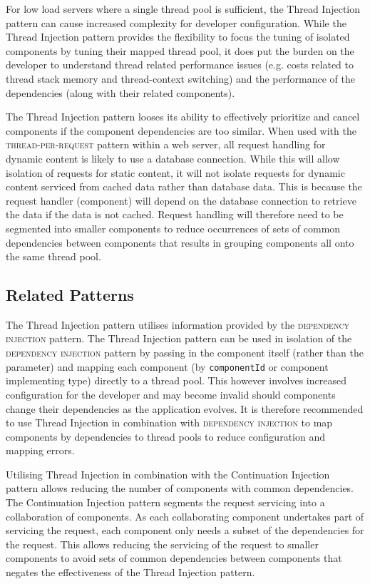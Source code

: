 \documentclass[prodmode]{style/acmlarge}
\begin{document}
For low load servers where a single thread pool is sufficient, the Thread
Injection pattern can cause increased complexity for developer configuration.
While the Thread Injection pattern provides the flexibility to focus the tuning
of isolated components by tuning their mapped thread pool, it does put the
burden on the developer to understand thread related performance issues (e.g.
costs related to thread stack memory and thread-context switching) and the
performance of the dependencies (along with their related components).

The Thread Injection pattern looses its ability to effectively prioritize and
cancel components if the component dependencies are too similar.  When used with
the \textsc{thread-per-request} pattern within a web server, all request
handling for dynamic content is likely to use a database connection.  While this
will allow isolation of requests for static content, it will not isolate
requests for dynamic content serviced from cached data rather than database
data.  This is because the request handler (component) will depend on the
database connection to retrieve the data if the data is not cached.  Request
handling will therefore need to be segmented into smaller components to reduce
occurrences of sets of common dependencies between components that results in
grouping components all onto the same thread pool.


\subsection{Related Patterns}

The Thread Injection pattern utilises information provided by the
\textsc{dependency injection} pattern.  The Thread Injection pattern can be used
in isolation of the \textsc{dependency injection} pattern by passing in the
component itself (rather than the parameter) and mapping each component (by
\texttt{componentId} or component implementing type) directly to a thread pool. 
This however involves increased configuration for the developer and may become
invalid should components change their dependencies as the application evolves. 
It is therefore recommended to use Thread Injection in combination with
\textsc{dependency injection} to map components by dependencies to thread pools
to reduce configuration and mapping errors.

Utilising Thread Injection in combination with the Continuation Injection
pattern allows reducing the number of components with common dependencies.  The
Continuation Injection pattern segments the request servicing into a
collaboration of components.  As each collaborating component undertakes part of
servicing the request, each component only needs a subset of the dependencies
for the request.  This allows reducing the servicing of the request to smaller
components to avoid sets of common dependencies between components that negates
the effectiveness of the Thread Injection pattern.
\end{document}
